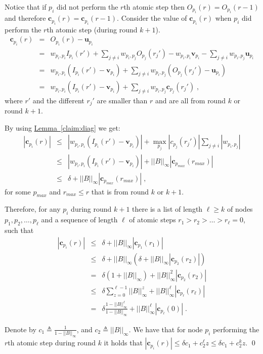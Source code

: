 \documentclass[preprint,12pt]{elsarticle}
\newenvironment{proof}{\noindent{\bf Proof:~~}}{}
\newcommand{\namedref}[2]{\hyperref[#2]{#1~\ref*{#2}}}
\newcommand{\lemmaref}[1]{\namedref{Lemma}{#1}}
\newcommand\normi[1]{\left|\left|#1\right|\right|_\infty}
\newcommand{\uu}{\mathbf{u}}
\newcommand{\vv}{\mathbf{v}}
\newcommand{\cc}{\mathbf{c}}
\newcommand{\II}[2]{I_{#1}(#2)}
\newcommand{\OO}[2]{O_{#1}(#2)}
\begin{document}
\begin{proof}
 Notice that if $p_i$ did not perform the
$r$th atomic step then $\OO{p_i}{r} = \OO{p_i}{r-1}$ and therefore
$\cc_{p_i}(r) = \cc_{p_i}(r-1)$. Consider the value of
$\cc_{p_i}(r)$ when $p_i$ did perform the $r$th atomic step
(during round $k+1$).
\begin{eqnarray*}
  \cc_{p_i}(r) & = & \OO{p_i}{r} - \uu_{p_i}\\
             & = & w_{p_i,p_i} \II{p_i}{r'} + \sum_{j \neq i}w_{p_i, p_j}  \OO{p_j}{r_j'} - w_{p_i,p_i}\vv_{p_i} - \sum_{j \neq i}w_{p_i, p_j}\uu_{p_i}\\
             & = & w_{p_i,p_i} (\II{p_i}{r'}-\vv_{p_i}) + \sum_{j \neq i}w_{p_i, p_j}  (\OO{p_j}{r_j'}-\uu_{p_i}) \\
             & = & w_{p_i,p_i} (\II{p_i}{r'}-\vv_{p_i}) + \sum_{j \neq i}w_{p_i, p_j}  \cc_{p_j}(r_j')\;,
\end{eqnarray*}
where $r'$ and the different $r_j'$ are smaller than $r$ and are
all from round $k$ or round $k+1$.

By using \lemmaref{claim:diag} we get:
\begin{eqnarray*}
  |\cc_{p_i}(r)| & \leq & |w_{p_i,p_i} (\II{p_i}{r'}-\vv_{p_i})| + \max_{p_j}|c_{p_j}(r_j')| \sum_{j \neq i}|w_{p_i, p_j}| \\
               & \leq & |w_{p_i,p_i} (\II{p_i}{r'}-\vv_{p_i})| + \normi{B}|\cc_{p_{max}}(r_{max})| \\
               & \leq & \delta + \normi{B}|\cc_{p_{max}}(r_{max})|\;,
\end{eqnarray*}
for some $p_{max}$ and $r_{max} \leq r$ that is from round $k$ or
$k+1$.

Therefore, for any $p_i$ during round $k+1$ there is a list of
length $\ell \geq k$ of nodes $p_1, p_2, \dots, p_\ell$ and a
sequence of length $\ell$ of atomic steps $r_1 > r_2 > \dots >
r_{\ell} = 0$, such that
\begin{eqnarray*}
  |\cc_{p_i}(r)| & \leq & \delta + \normi{B}|\cc_{p_1}(r_1)|\\
                     & \leq & \delta + \normi{B}(\delta + \normi{B}|\cc_{p_2}(r_2)|)\\
                     & = & \delta  (1 + \normi{B}) + \normi{B}^2|\cc_{p_2}(r_2)|\\
                     & \leq & \delta  \sum_{z=0}^{\ell-1}\normi{B}^z + \normi{B}^\ell|\cc_{p_\ell}(r_\ell)|\\
                     & = & \delta  \frac{1-\normi{B}^\ell}{1-\normi{B}} + \normi{B}^\ell|\cc_{p_\ell}(0)|\;.
\end{eqnarray*}


Denote by $c_1 \triangleq
\frac{1}{1-\normi{B}}$, and $c_2 \triangleq \normi{B}$. We have
that for node $p_i$ performing the $r$th atomic step during round
$k$ it holds that $|\cc_{p_i}(r)| \leq \delta  c_1 + c_2^\ell
 z \leq \delta  c_1 + c_2^k  z$.
\qed\end{proof}
\end{document}
